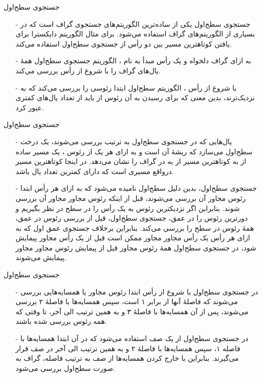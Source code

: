 
\begin{frame}{‌جستجوی سطح‌اول}
\begin{itemize}\itemr
\item[-]
جستجوی سطح‌اول
یکی از ساده‌ترین الگوریتم‌های جستجوی گراف است که در بسیاری از الگوریتم‌های گراف استفاده می‌شود. برای مثال الگوریتم دایکسترا برای یافتن کوتاهترین مسیر بین دو رأس از جستجوی سطح‌اول استفاده می‌کند.
\item[-]
به ازای گراف دلخواه
و یک رأس مبدأ
به نام
، الگوریتم جستجوی سطح‌اول همهٔ یال‌های گراف
را با شروع از رأس
بررسی می‌کند.
\item[-]
با شروع از رأس
، الگوریتم سطح‌اول ابتدا رئوسی را بررسی می‌کند که به
نزدیک‌ترند،
بدین معنی که برای رسیدن به آن رئوس از
باید از تعداد یال‌های کمتری عبور کرد.
\end{itemize}
\end{frame}


\begin{frame}{‌جستجوی سطح‌اول}
\begin{itemize}\itemr
\item[-]
یال‌هایی که در جستجوی سطح‌اول به ترتیب بررسی می‌شوند، یک درخت سطح‌اول می‌سازد که ریشهٔ آن
است و به ازای هر یک از رئوس
، یک مسیر ساده از
به
کوتاهترین مسیر از
به
در گراف را نشان می‌دهد.
در اینجا کوتاهترین مسیر درواقع مسیری است که دارای کمترین تعداد یال باشد.
\item[-]
جستجوی سطح‌اول، بدین دلیل سطح‌اول نامیده می‌شود که به ازای هر رأس
ابتدا رئوس مجاور آن بررسی  می‌شوند، قبل از اینکه رئوس مجاور مجاور آن بررسی شوند.
بنابراین اگر نزدیکترین رئوس به یک رأس را در سطح در نظر بگیریم و دورترین رئوس را در عمق، جستجوی سطح‌اول، قبل از بررسی رئوس در عمق، همهٔ رئوس در سطح را بررسی می‌کند.
بنابراین برخلاف جستجوی عمق اول که به ازای هر رأس
یک رأس مجاور مجاور
 ممکن است قبل از یک رأس مجاور
  پیمایش شود، در جستجوی سطح‌اول همهٔ رئوس مجاور
قبل از پیمایش رئوس مجاور مجاور 
پیمایش می‌شوند.
\end{itemize}
\end{frame}


\begin{frame}{‌جستجوی سطح‌اول}
\begin{itemize}\itemr
\item[-]
 در جستجوی سطح‌اول با شروع از رأس
ابتدا رئوس مجاور
 یا همسایه‌هایی
  بررسی می‌شوند که فاصلهٔ آنها از
برابر ۱ است، سپس همسایه‌ها با فاصلهٔ ۲ بررسی می‌شوند، پس از آن همسایه‌ها با فاصلهٔ ۳ و به همین ترتیب الی آخر، تا وقتی که همه رئوس بررسی شده باشند.
\item[-]
در جستجوی سطح‌اول از یک صف استفاده می‌شود که در آن ابتدا همسایه‌ها با فاصله ۱، سپس همسایه‌ها با فاصلهٔ ۲ و به همین ترتیب الی آخر در صف قرار می‌گیرند. بنابراین با خارج کردن همسایه‌ها از صف به ترتیب فاصله، گراف به صورت سطح‌اول بررسی می‌شود.
\end{itemize}
\end{frame}


